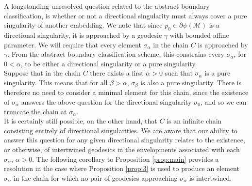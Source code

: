 \documentclass[pdflatex,sn-mathphys-num]{sn-jnl}
\newcommand{\Junbang}[1]{{\color{magenta}#1}}
\newtheorem{prop}[theorem]{Proposition}
\theoremstyle{definition}
\begin{document}

A longstanding unresolved question related to the abstract boundary classification, is whether or not a directional singularity must always cover a pure singularity of another embedding. We note that since $p_0 \in \partial\psi(\mathcal{M})$ is a directional singularity, it is approached by a geodesic $\gamma$ with bounded affine parameter. We will require that every element $\sigma_{\alpha}$ in the chain $C$ is approached by $\gamma$. From the abstract boundary classification scheme, this constrains every $\sigma_{\alpha}$, for $0 < \alpha$, to be either a directional singularity or a pure singularity.\\

Suppose that in the chain $C$ there exists a first $\alpha > 0$ such that $\sigma_{\alpha}$ is a pure singularity. This means that for all $\beta > \alpha$, $\sigma_{\beta}$ is also a pure singularity. There is therefore no need to consider a minimal element for this chain, since the existence of $\sigma_{\alpha}$ answers the above question for the directional singularity $\sigma_{0}$, and so we can truncate the chain at $\sigma_{\alpha}$.\\

It is certainly still possible, on the other hand, that $C$ is an infinite chain consisting entirely of directional singularities. We are aware that our ability to answer this question for any given directional singularity relates to the existence, or otherwise, of intertwined geodesics in the envelopments associated with each $\sigma_{\alpha}$, $\alpha > 0$. The following corollary to Proposition \ref{prop:main} provides a resolution in the case where Proposition \ref{prop:3} is used to produce an element $\sigma_{\alpha}$ in the chain for which no pair of geodesics approaching $\sigma_{\alpha}$ is intertwined.\\
\end{document}
